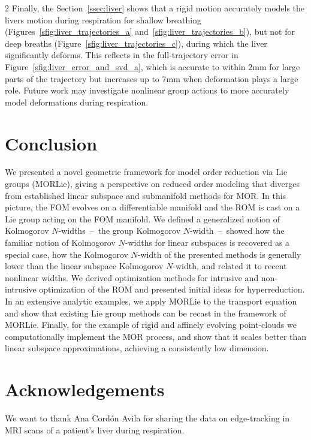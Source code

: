 \documentclass{article}
\begin{document}
\begin{multicols}{2}
Finally, the Section~\ref{ssec:liver} shows that a rigid motion accurately models the livers motion during respiration for shallow breathing (Figures~\ref{sfig:liver_trajectories_a} and~\ref{sfig:liver_trajectories_b}), but not for deep breaths (Figure~\ref{sfig:liver_trajectories_c}), during which the liver significantly deforms. This reflects in the full-trajectory error in Figure~\ref{sfig:liver_error_and_svd_a}, which is accurate to within 2mm for large parts of the trajectory but increases up to 7mm when deformation plays a large role. Future work may investigate nonlinear group actions to more accurately model deformations during respiration.

\section{Conclusion}\label{sec:conclusion}
We presented a novel geometric framework for model order reduction via Lie groups (MORLie), giving a perspective on reduced order modeling that diverges from established linear subspace and submanifold methods for MOR. In this picture, the FOM evolves on a differentiable manifold and the ROM is cast on a Lie group acting on the FOM manifold. We defined a generalized notion of Kolmogorov $N$-widths~--~the group Kolmogorov $N$-width~--~showed how the familiar notion of Kolmogorov $N$-widths for linear subspaces is recovered as a special case, how the Kolmogorov $N$-width of the presented methods is generally lower than the linear subspace Kolmogorov $N$-width, and related it to recent nonlinear widths. We derived optimization methods for intrusive and non-intrusive optimization of the ROM and presented initial ideas for hyperreduction. In an extensive analytic examples, we apply MORLie to the transport equation and show that existing Lie group methods can be recast in the framework of MORLie. Finally, for the example of rigid and affinely evolving point-clouds we computationally implement the MOR process, and show that it scales better than linear subspace approximations, achieving a consistently low dimension.  


\section{Acknowledgements}
We want to thank Ana Cord\'{o}n Avila for sharing the data on edge-tracking in MRI scans of a patient's liver during respiration.

% 

% 
% 


\end{multicols}
\end{document}
